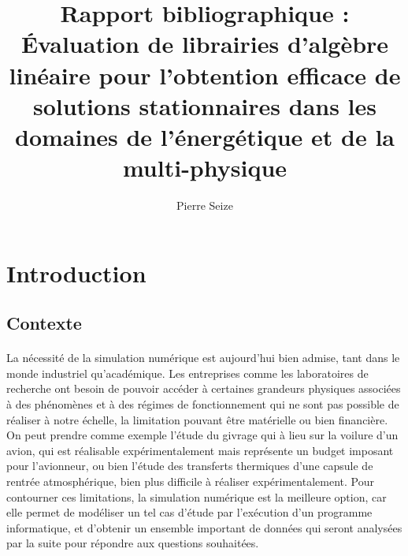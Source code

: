 \documentclass[a4paper]{article}
\title{Rapport bibliographique :\\[\baselineskip]\large Évaluation de librairies d'algèbre linéaire pour l'obtention efficace de solutions stationnaires dans les domaines de l'énergétique et de la multi-physique}
\author{Pierre Seize}
\date{}
\begin{document}
\maketitle


\section{Introduction}

	\subsection{Contexte}

		\paragraph{} La nécessité de la simulation numérique est aujourd'hui bien admise, tant dans le monde industriel qu'académique.
		Les entreprises comme les laboratoires de recherche ont besoin de pouvoir accéder à certaines grandeurs physiques associées à des phénomènes et à des régimes de fonctionnement qui ne sont pas possible de réaliser à notre échelle, la limitation pouvant être matérielle ou bien financière.
		On peut prendre comme exemple l'étude du givrage qui à lieu sur la voilure d'un avion, qui est réalisable expérimentalement mais représente un budget imposant pour l’avionneur, ou bien l'étude des transferts thermiques d'une capsule de rentrée atmosphérique, bien plus difficile à réaliser expérimentalement.
		Pour contourner ces limitations, la simulation numérique est la meilleure option, car elle permet de modéliser un tel cas d'étude par l’exécution d'un programme informatique, et d'obtenir un ensemble important de données qui seront analysées par la suite pour répondre aux questions souhaitées.
\end{document}
